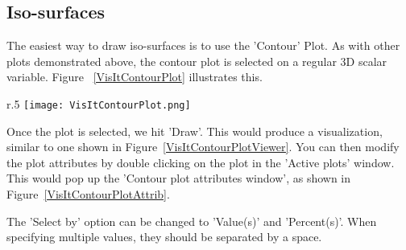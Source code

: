 \subsection{Iso-surfaces}

The easiest way to draw iso-surfaces is to use the 'Contour' Plot. As
with other plots demonstrated above, the contour plot is selected on a
regular 3D scalar variable. Figure ~\ref{VisItContourPlot} illustrates
this.

\begin{wrapfigure}{r}{.5\textwidth}
  \center
  \vspace{-35pt}
  \texttt{[image: VisItContourPlot.png]}
  \caption{Selecting the 'Contour' plot on a regular 3D scalar variable}
  \label{VisItContourPlot}
\end{wrapfigure}

Once the plot is selected, we hit 'Draw'. This would produce a
visualization, similar to one shown in
Figure~\ref{VisItContourPlotViewer}. You can then modify the plot
attributes by double clicking on the plot in the 'Active plots'
window. This would pop up the 'Contour plot attributes window', as
shown in Figure~\ref{VisItContourPlotAttrib}.

The 'Select by' option can be changed to 'Value(s)' and
'Percent(s)'. When specifying multiple values, they should be
separated by a space.




\begin{figure}[h]
  \centering
 \vspace{5pt}
  \hspace{50pt}
 \vspace{-10pt}
  \caption{}
 \vspace{-10pt}
  \label{}

\end{figure}


